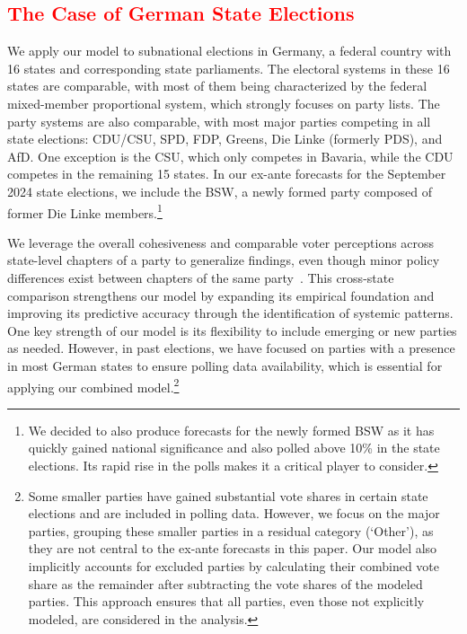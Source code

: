 \documentclass[12pt]{article}
\begin{document}
\begin{doublespacing}
\section{\textcolor{red}{The Case of German State Elections}}


We apply our model to subnational elections in Germany, a federal country with 16 states and corresponding state parliaments.  The electoral systems in these 16 states are comparable, with most of them being characterized by the federal mixed-member proportional system, which strongly focuses on party lists. The party systems are also comparable, with most major parties competing in all state elections: CDU/CSU, SPD, FDP, Greens, Die Linke (formerly PDS), and AfD. One exception is the CSU, which only competes in Bavaria, while the CDU competes in the remaining 15 states. In our ex-ante forecasts for the September 2024 state elections, we include the BSW, a newly formed party composed of former Die Linke members.\footnote{We decided to also produce forecasts for the newly formed BSW as it has quickly gained national significance and also polled above 10\% in the state elections. Its rapid rise in the polls makes it a critical player to consider. }

We leverage the overall cohesiveness and comparable voter perceptions across state-level chapters of a party to generalize findings, even though minor policy differences exist between chapters of the same party~\citep{Brauninger2020}. This cross-state comparison strengthens our model by expanding its empirical foundation and improving its predictive accuracy through the identification of systemic patterns. One key strength of our model is its flexibility to include emerging or new parties as needed. However, in past elections, we have focused on parties with a presence in most German states to ensure polling data availability, which is essential for applying our combined model.\footnote{Some smaller parties have gained substantial vote shares in certain state elections and are included in polling data. However, we focus on the major parties, grouping these smaller parties in a residual category (`Other'), as they are not central to the ex-ante forecasts in this paper. Our model also implicitly accounts for excluded parties by calculating their combined vote share as the remainder after subtracting the vote shares of the modeled parties. This approach ensures that all parties, even those not explicitly modeled, are considered in the analysis.}



\end{doublespacing}
\end{document}
